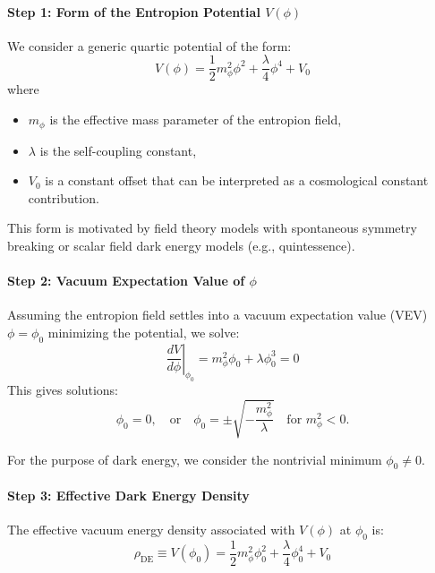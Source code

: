 \documentclass[12pt]{article}
\begin{document}
\paragraph{Step 1: Form of the Entropion Potential \( V(\phi) \)}

We consider a generic quartic potential of the form:
\begin{equation}
V(\phi) = \frac{1}{2} m_\phi^2 \phi^2 + \frac{\lambda}{4} \phi^4 + V_0
\label{eq:A15_potential_form}
\end{equation}
where
\begin{itemize}
    \item \( m_\phi \) is the effective mass parameter of the entropion field,
    \item \(\lambda\) is the self-coupling constant,
    \item \( V_0 \) is a constant offset that can be interpreted as a cosmological constant contribution.
\end{itemize}

This form is motivated by field theory models with spontaneous symmetry breaking or scalar field dark energy models (e.g., quintessence).

\vspace{1em}
\noindent
\paragraph{Step 2: Vacuum Expectation Value of \( \phi \)}

Assuming the entropion field settles into a vacuum expectation value (VEV) \(\phi = \phi_0\) minimizing the potential, we solve:
\begin{equation}
\left.\frac{dV}{d\phi}\right|_{\phi_0} = m_\phi^2 \phi_0 + \lambda \phi_0^3 = 0
\label{eq:A15_VEV_condition}
\end{equation}
This gives solutions:
\[
\phi_0 = 0, \quad \text{or} \quad \phi_0 = \pm \sqrt{-\frac{m_\phi^2}{\lambda}} \quad \text{for } m_\phi^2 < 0.
\]

For the purpose of dark energy, we consider the nontrivial minimum \(\phi_0 \neq 0\).

\vspace{1em}
\noindent
\paragraph{Step 3: Effective Dark Energy Density}

The effective vacuum energy density associated with \(V(\phi)\) at \(\phi_0\) is:
\begin{equation}
\rho_{\text{DE}} \equiv V(\phi_0) = \frac{1}{2} m_\phi^2 \phi_0^2 + \frac{\lambda}{4} \phi_0^4 + V_0
\label{eq:A15_dark_energy_density}
\end{equation}
\end{document}
